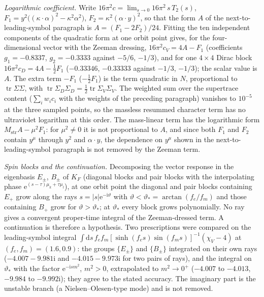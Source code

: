 \emph{Logarithmic coefficient.} Write \(16\pi^2c=\lim_{s\to0}16\pi^2\,s\,T_2(s)\), \(F_1=y^2\bigl((\kappa\cdot\alpha)^2-\kappa^2\alpha^2\bigr)\), \(F_2=\kappa^2(\alpha\cdot y)^2\), so that the form \(A\) of the next-to-leading-symbol paragraph is \(A=(F_1-2F_2)/24\). Fitting the ten independent components of the quadratic form at one orbit point gives, for the four-dimensional vector with the Zeeman dressing, \(16\pi^2c_V=4A-F_1\) (coefficients \(g_1=-0.8337\), \(g_2=-0.3333\) against \(-5/6\), \(-1/3\)), and for one \(4\times4\) Dirac block \(16\pi^2c_D=4A-\tfrac12F_1\) (\(-0.33346\), \(-0.33333\) against \(-1/3\), \(-1/3\)); the scalar value is \(A\). The extra term \(-F_1\) (\(-\tfrac12F_1\)) is the term quadratic in \(N\), proportional to \(\operatorname{tr}\Sigma\Sigma\), with \(\operatorname{tr}\Sigma_D\Sigma_D=\tfrac12\operatorname{tr}\Sigma_V\Sigma_V\). The weighted sum over the supertrace content (\(\sum_iw_ic_i\) with the weights of the preceding paragraph) vanishes to \(10^{-5}\) at the three sampled points, so the massless resummed character term has no ultraviolet logarithm at this order. The mass-linear term has the logarithmic form \(M_{\mathrm{str}}A-\mu^2F_1\): for \(\mu^2\ne0\) it is not proportional to \(A\), and since both \(F_1\) and \(F_2\) contain \(y^\mu\) through \(y^2\) and \(\alpha\cdot y\), the dependence on \(y^\mu\) shown in the next-to-leading-symbol paragraph is not removed by the Zeeman term.

\emph{Spin blocks and the continuation.} Decomposing the vector response in the eigenbasis \(E_\pm\), \(B_\pm\) of \(K_F\) (diagonal blocks and pair blocks with the interpolating phase \(\mathrm e^{(s-\tau)\mu_k+\tau\mu_l}\)), at one orbit point the diagonal and pair blocks containing \(E_+\) grow along the rays \(s=|s|\mathrm e^{-\mathrm i\vartheta}\) with \(\vartheta<\vartheta_*=\arctan(f_e/f_m)\) and those containing \(B_+\) grow for \(\vartheta>\vartheta_*\); at \(\vartheta_*\) every block grows polynomially. No ray gives a convergent proper-time integral of the Zeeman-dressed term. A continuation is therefore a hypothesis. Two prescriptions were compared on the leading-symbol integral \(\int\mathrm ds\,f_ef_m[\sinh(f_es)\sin(f_ms)]^{-1}(\chi_V-4)\) at \((f_e,f_m)=(1.6,0.9)\): the groups \(\{E_\pm\}\) and \(\{B_\pm\}\) integrated on their own rays (\(-4.007-9.981\mathrm i\) and \(-4.015-9.973\mathrm i\) for two pairs of rays), and the integral on \(\vartheta_*\) with the factor \(\mathrm e^{-\mathrm ism^2}\), \(m^2>0\), extrapolated to \(m^2\to0^+\) (\(-4.007\) to \(-4.013\), \(-9.984\) to \(-9.992\mathrm i\)); they agree to the stated accuracy. The imaginary part is the unstable branch (a Nielsen--Olesen-type mode) and is not removed.

